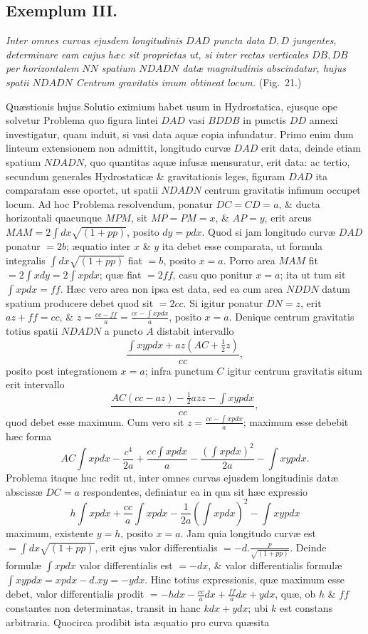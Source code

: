 \subsection*{Exemplum III.}
\textit{Inter omnes curvas ejusdem longitudinis $DAD$ puncta data $D,D$ jungentes, determinare eam cujus hæc sit proprietas ut, si inter rectas verticales $DB,DB$ per horizontalem $NN$ spatium $NDADN$ datæ magnitudinis abscindatur, hujus spatii $NDADN$ Centrum gravitatis imum obtineat locum.} (Fig.~21.)

Quæstionis hujus Solutio eximium habet usum in Hydrostatica,
ejusque ope solvetur Problema quo figura lintei $DAD$ vasi $BDDB$ in punctis $DD$ annexi investigatur, quam induit, si vasi data aquæ copia infundatur. Primo enim dum linteum extensionem non admittit, longitudo curvæ $DAD$ erit data, deinde etiam spatium $NDADN$, quo quantitas aquæ infusæ mensuratur, erit data: ac tertio, secundum generales Hydrostaticæ \& gravitationis leges, figuram $DAD$ ita comparatam esse oportet, ut spatii $NDADN$ centrum gravitatis infimum occupet locum. Ad hoc Problema resolvendum, ponatur $DC=CD=a$, \& ducta horizontali quacunque $MPM$, sit $MP=PM=x$, \& $AP=y$, erit arcus $MAM=2\int dx\sqrt{(1+pp)}$, posito $dy=pdx$. Quod si jam longitudo curvæ $DAD$ ponatur $=2b$; æquatio inter $x$ \& $y$ ita debet esse comparata, ut formula integralis $\int dx\sqrt{(1+pp)}$ fiat $=b$, posito $x=a$. Porro area $MAM$ fit $=2\int xdy=2\int xpdx$; quæ fiat $=2ff$, casu quo ponitur $x=a$; ita ut tum sit $\int xpdx=ff$. Hæc vero area non ipsa est data, sed ea cum area $NDDN$ datum spatium producere debet quod sit $=2cc$. Si igitur ponatur $DN=z$, erit $az+ff=cc$, \& $z=\frac{cc-ff}{a}=\frac{cc-\int xpdx}{a}$, posito $x=a$. Denique centrum gravitatis totius spatii $NDADN$ a puncto $A$ distabit intervallo
\[\frac{\int xypdx+az(AC+\frac12z)}{cc},\]
posito post integrationem $x=a$; infra punctum $C$ igitur centrum gravitatis situm erit intervallo
\[\frac{AC(cc-az)-\frac12azz-\int xypdx}{cc},\]
quod debet esse maximum. Cum vero sit $z=\frac{cc-\int xpdx}{a}$; maximum esse debebit hæc forma
\[AC\int xpdx-\frac{c^4}{2a}+\frac{cc\int xpdx}{a}-\frac{(\int xpdx)^2}{2a}-\int xypdx.\]
Problema itaque huc redit ut, inter omnes curvas ejusdem longitudinis datæ abscissæ $DC=a$ respondentes, definiatur ea in qua sit hæc expressio
\[h\int xpdx+\frac{cc}{a}\int xpdx-\frac1{2a}(\int xpdx)^2-\int xypdx\]
maximum, existente $y=h$, posito $x=a$. Jam quia longitudo curvæ est $=\int dx\sqrt{(1+pp)}$, erit ejus valor differentialis $=-d.\frac p{\sqrt{(1+pp)}}$. Deinde formulæ $\int xpdx$ valor differentialis est $=-dx$, \& valor differentialis formulæ $\int xypdx=xpdx-d.xy=-ydx$. Hinc totius expressionis, quæ maximum esse debet, valor differentialis prodit $=-hdx-\frac{cc}{a}dx+\frac{ff}{a}dx+ydx$, quæ, ob $h$ \& $ff$ constantes non determinatas, transit in hanc $kdx+ydx$; ubi $k$ est constans arbitraria. Quocirca prodibit ista æquatio pro curva quæsita
